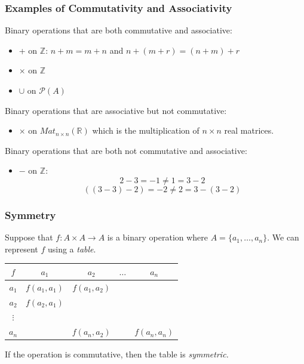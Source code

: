 \documentclass[11pt]{article}
\begin{document}
    \subsubsection{Examples of Commutativity and Associativity}
    
    Binary operations that are both commutative and associative:
    \begin{itemize}
        \item + on \(\mathbb{Z}\): \(n + m = m + n\) and \(n + (m + r) = (n + m) + r\)
        \item \(\times\) on \(\mathbb{Z}\)
        \item \(\cup\) on \(\mathcal{P}(A)\)
    \end{itemize}

    Binary operations that are associative but not commutative:
    \begin{itemize}
        \item \(\times\) on \(Mat_{n \times n}(\mathbb{R})\) which is the multiplication of $n \times n$ real matrices.
    \end{itemize}


    Binary operations that are both not commutative and associative:
    \begin{itemize}
        \item \(-\) on \(\mathbb{Z}\): \[2 - 3 = -1 \neq 1 = 3 - 2\] \[((3-3) - 2) = -2 \neq 2 = 3 - (3 - 2) \]
    \end{itemize}

    \subsubsection{Symmetry}

    Suppose that \(f: A \times A \rightarrow A\) is a binary operation where \(A = \{a_1, \dots, a_n\}\). We can represent $f$ using a \emph{table}.
    \begin{center}
        \begin{tabular}{| c | c | c | c | c |} \hline
            $f$      & $a_1$        & $a_2$        & $\dots$ & $a_n$        \\ \hline
            $a_1$    & $f(a_1,a_1)$ & $f(a_1,a_2)$ &         &              \\ \hline
            $a_2$    & $f(a_2,a_1)$ &              &         &              \\ \hline
            $\vdots$ &              &              &         &              \\ \hline
            $a_n$    &              & $f(a_n,a_2)$ &         & $f(a_n,a_n)$ \\ \hline
            
        \end{tabular}
    \end{center}
    If the operation is commutative, then the table is \emph{symmetric.}
\end{document}
